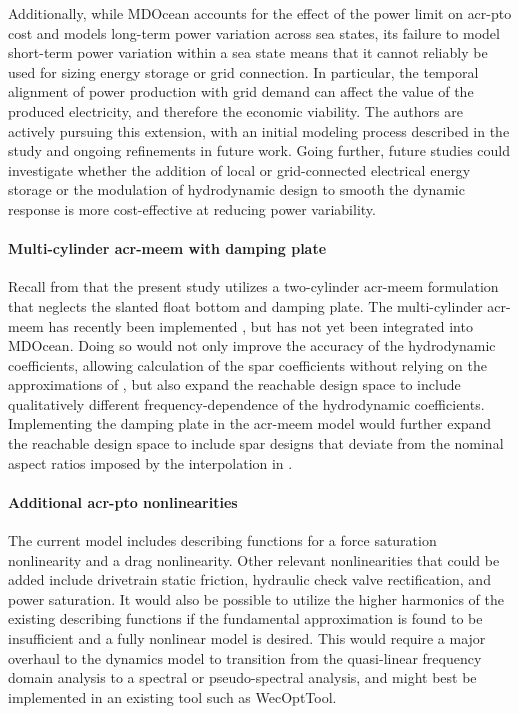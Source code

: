 \documentclass[a4paper,fleqn,colorlinks,unicode,lineno]{cas-dc} %
\begin{document}
    Additionally, while MDOcean accounts for the effect of the power limit on \gls{acr-pto} cost and models long-term power variation across sea states, its failure to model short-term power variation within a sea state means that it cannot reliably be used for sizing energy storage or grid connection.
    In particular, the temporal alignment of power production with grid demand can affect the value of the produced electricity, and therefore the economic viability.
    The authors are actively pursuing this extension, with an initial modeling process described in the study \citep{mccabe_wec_2025} and ongoing refinements in future work.
    Going further, future studies could investigate whether the addition of local or grid-connected electrical energy storage or the modulation of hydrodynamic design to smooth the dynamic response is more cost-effective at reducing power variability.

    \paragraph{Multi-cylinder \gls{acr-meem} with damping plate}
    Recall from  that the present study utilizes a two-cylinder \gls{acr-meem} formulation that neglects the slanted float bottom and damping plate.
    The multi-cylinder \gls{acr-meem} has recently been implemented \citep{best_openflash_2026,bimali_matrix_2026}, but has not yet been integrated into MDOcean.
    Doing so would not only improve the accuracy of the hydrodynamic coefficients, allowing calculation of the spar coefficients without relying on the approximations of , but also expand the reachable design space to include qualitatively different frequency-dependence of the hydrodynamic coefficients.
    Implementing the damping plate in the \gls{acr-meem} model would further expand the reachable design space to include spar designs that deviate from the nominal aspect ratios imposed by the interpolation in .

    \paragraph{Additional \gls{acr-pto} nonlinearities}
    The current model includes describing functions for a force saturation nonlinearity and a drag nonlinearity.
    Other relevant nonlinearities that could be added include drivetrain static friction, hydraulic check valve rectification, and power saturation.
    It would also be possible to utilize the higher harmonics of the existing describing functions if the fundamental approximation is found to be insufficient and a fully nonlinear model is desired.
    This would require a major overhaul to the dynamics model to transition from the quasi-linear frequency domain analysis to a spectral or pseudo-spectral analysis, and might best be implemented in an existing tool such as WecOptTool.
\end{document}
